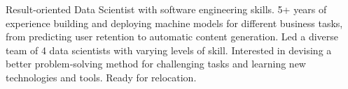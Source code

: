 

\begin{cvparagraph}

Result-oriented Data Scientist with software engineering skills. 5+ years of experience building and deploying machine models for different business tasks, from predicting user retention to automatic content generation. Led a diverse team of 4 data scientists with varying levels of skill. Interested in devising a better problem‐solving method for challenging tasks and learning new technologies and tools. Ready for relocation.
\end{cvparagraph}
